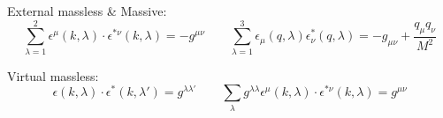 External massless \& Massive:
\begin{equation*}
        \sum_{\lambda=1}^{2} \epsilon^{\mu}(k,\lambda) \cdot \epsilon^{*\nu}(k,\lambda) = -g^{\mu\nu}
        \qquad
        \sum_{\lambda=1}^{3} \epsilon_\mu(q,\lambda)\epsilon^*_\nu(q,\lambda)
        = -g_{\mu\nu} + \frac{q_\mu q_\nu}{M^2}
\end{equation*}

Virtual massless:
\begin{equation*}
        \epsilon(k,\lambda) \cdot \epsilon^*(k,\lambda') = g^{\lambda\lambda'}
        \qquad
        \sum_{\lambda}g^{\lambda\lambda} \epsilon^{\mu}(k,\lambda) \cdot \epsilon^{*\nu}(k,\lambda) = g^{\mu\nu}
\end{equation*}


